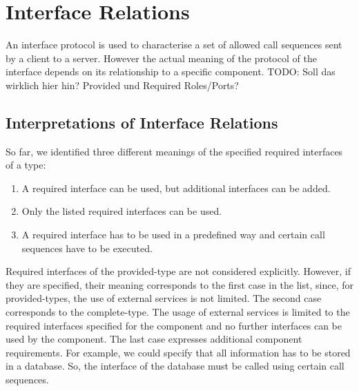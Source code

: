 %
%
%
%
%

\section{Interface Relations}

An interface protocol is used to characterise a set of allowed call sequences
sent by a client to a server. However the actual meaning of the protocol of the
interface depends on its relationship to a specific component. TODO: Soll das
wirklich hier hin? Provided und Required Roles/Ports?


\subsection*{Interpretations of Interface Relations}
So far, we identified three different meanings of the specified required
interfaces of a type:
\begin{enumerate}
\item	A required interface can be used, but additional interfaces can be
added.
\item	Only the listed required interfaces can be used.
\item	A required interface has to be used in a predefined way and certain call
sequences have to be executed. 
\end{enumerate}

Required interfaces of the provided-type are not considered explicitly. However,
if they are specified, their meaning corresponds to the first case in the list,
since, for provided-types, the use of external services is not limited. The
second case corresponds to the complete-type. The usage of external services is
limited to the required interfaces specified for the component and no further
interfaces can be used by the component. The last case expresses additional
component requirements. For example, we could specify that all information has
to be stored in a database. So, the interface of the database must be called
using certain call sequences.
